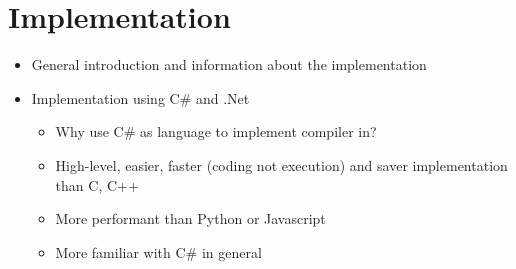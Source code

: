 \chapter{Implementation}
\label{ch:implementation}
\begin{itemize}
    \item General introduction and information about the implementation
    \item Implementation using C\# and .Net
    \begin{itemize}
        \item Why use C\# as language to implement compiler in?
        \item High-level, easier, faster (coding not execution) and saver implementation than C, C++
        \item More performant than Python or Javascript
        \item More familiar with C\# in general
    \end{itemize}
\end{itemize}











